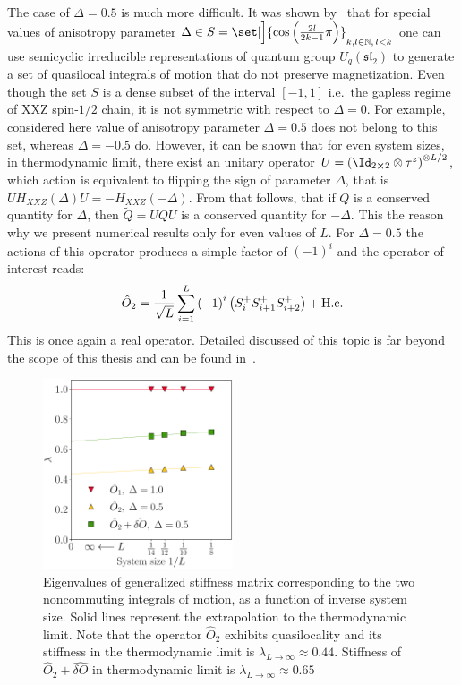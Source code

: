 The case of \(\Delta=0.5\) is much more difficult. It was shown by~\textcite{zadnik2016} that for 
special values of anisotropy parameter \(\Delta \in S = \set[\Big]{\cos\left(\frac{2l}{2k-1}
\pi\right)}_{k,l\in \NN,\, l<k}\) one can use semicyclic irreducible representations
of quantum group \(U_q(\mathfrak{sl}_2)\) to generate a set of quasilocal integrals of 
motion that do not preserve magnetization. Even though the set \(S\) is a dense subset
of the interval \([-1,1]\) i.e.\ the gapless regime of XXZ spin-\(1/2\) chain, it is not
symmetric with respect to \(\Delta=0\). For example, considered here value of anisotropy parameter
\(\Delta=0.5\) does not belong to this set, whereas \(\Delta=-0.5\) do. However, it can be shown
that for even system sizes, in thermodynamic limit, there exist an unitary operator 
\(U = \left(\Id_{2\cross 2}\otimes \tau^z\right)^{\otimes L/2}\), which action is equivalent to flipping the sign 
of parameter \(\Delta\), that is \(UH_{XXZ}(\Delta)U = -H_{XXZ}(-\Delta)\). From that follows,
that if \(Q\) is a conserved quantity for \(\Delta\), then \(\tilde{Q} = UQU\) is a conserved
quantity for \(-\Delta\). This the reason why we present numerical results only for even 
values of \(L\). For \(\Delta=0.5\) the actions
of this operator produces a simple factor of \((-1)^i\) and the operator of interest reads:
\begin{equation}
  \hat{O}_{2} =\frac{1}{\sqrt{L}} \sum_{i=1}^{L} {(-1)}^i \left( S^{+}_{i}S^{+}_{i+1}S^{+}_{i+2}\right) + \text{H.c.}
  \label{eq:delta 0.5}
\end{equation}  
This is once again a real operator. Detailed discussed of this topic is far beyond the scope of this thesis
and can be found in~\autocite{zadnik2016,Prosen2014c}.

\begin{figure}[htbp]
  \centering
  \includegraphics[width=0.5\textwidth]{Figures/nocomm_int.pdf}
  \caption{Eigenvalues of generalized stiffness matrix corresponding to the two noncommuting
    integrals of motion, as a function of inverse system size. Solid lines represent the extrapolation
    to the thermodynamic limit. Note that the operator \(\hat{O}_2\) exhibits quasilocality
    and its stiffness in the thermodynamic limit is \(\lambda_{L\to\infty} \approx
    0.44\). Stiffness of \(\hat{O}_2 + \hat{\delta O}\) in thermodynamic limit is
    \(\lambda_{L\to\infty} \approx 0.65\)}
  \label{fig: noncommuting integrable}
\end{figure}

